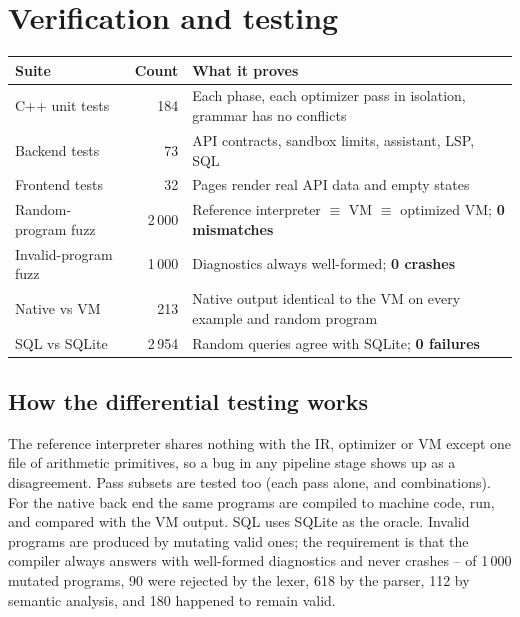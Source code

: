 \documentclass[11pt,a4paper]{article}
\begin{document}
\section{Verification and testing}
\begin{center}\small
\begin{tabularx}{\linewidth}{@{}l r X@{}}\toprule
Suite&Count&What it proves\\\midrule
C++ unit tests&184&Each phase, each optimizer pass in isolation, grammar has no conflicts\\
Backend tests&73&API contracts, sandbox limits, assistant, LSP, SQL\\
Frontend tests&32&Pages render real API data and empty states\\
Random-program fuzz&2\,000&Reference interpreter $\equiv$ VM $\equiv$ optimized VM; \textbf{0 mismatches}\\
Invalid-program fuzz&1\,000&Diagnostics always well-formed; \textbf{0 crashes}\\
Native vs VM&213&Native output identical to the VM on every example and random program\\
SQL vs SQLite&2\,954&Random queries agree with SQLite; \textbf{0 failures}\\\bottomrule
\end{tabularx}
\end{center}

\subsection{How the differential testing works}
\begin{center}
\end{center}
The reference interpreter shares nothing with the IR, optimizer or VM except one file of arithmetic primitives, so a bug in any pipeline stage shows up as a disagreement. Pass subsets are tested too (each pass alone, and combinations). For the native back end the same programs are compiled to machine code, run, and compared with the VM output. SQL uses SQLite as the oracle. Invalid programs are produced by mutating valid ones; the requirement is that the compiler always answers with well-formed diagnostics and never crashes -- of 1\,000 mutated programs, 90 were rejected by the lexer, 618 by the parser, 112 by semantic analysis, and 180 happened to remain valid.
\end{document}
